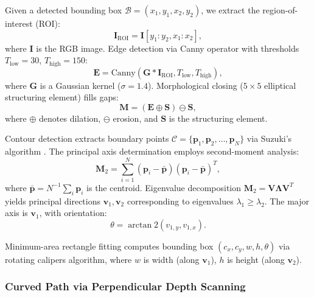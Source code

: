 \documentclass[journal]{IEEEtran}
\begin{document}
Given a detected bounding box $\mathcal{B} = (x_1, y_1, x_2, y_2)$, we extract the region-of-interest (ROI):
\begin{equation}
\mathbf{I}_{\text{ROI}} = \mathbf{I}[y_1:y_2, x_1:x_2],
\label{eq:roi_extraction}
\end{equation}
where $\mathbf{I}$ is the RGB image. Edge detection via Canny operator \cite{canny1986computational} with thresholds $T_{\text{low}} = 30$, $T_{\text{high}} = 150$:
\begin{equation}
\mathbf{E} = \text{Canny}(\mathbf{G} \ast \mathbf{I}_{\text{ROI}}, T_{\text{low}}, T_{\text{high}}),
\label{eq:canny_edge}
\end{equation}
where $\mathbf{G}$ is a Gaussian kernel ($\sigma = 1.4$). Morphological closing ($5 \times 5$ elliptical structuring element) fills gaps:
\begin{equation}
\mathbf{M} = (\mathbf{E} \oplus \mathbf{S}) \ominus \mathbf{S},
\label{eq:morphological_closing}
\end{equation}
where $\oplus$ denotes dilation, $\ominus$ erosion, and $\mathbf{S}$ is the structuring element.

Contour detection extracts boundary points $\mathcal{C} = \{\boldsymbol{p}_1, \boldsymbol{p}_2, \ldots, \boldsymbol{p}_N\}$ via Suzuki's algorithm \cite{suzuki1985topological}. The principal axis determination employs second-moment analysis:
\begin{equation}
\mathbf{M}_2 = \sum_{i=1}^{N} (\boldsymbol{p}_i - \bar{\boldsymbol{p}}) (\boldsymbol{p}_i - \bar{\boldsymbol{p}})^T,
\label{eq:second_moment}
\end{equation}
where $\bar{\boldsymbol{p}} = N^{-1} \sum_{i} \boldsymbol{p}_i$ is the centroid. Eigenvalue decomposition $\mathbf{M}_2 = \mathbf{V} \boldsymbol{\Lambda} \mathbf{V}^T$ yields principal directions $\boldsymbol{v}_1, \boldsymbol{v}_2$ corresponding to eigenvalues $\lambda_1 \geq \lambda_2$. The major axis is $\boldsymbol{v}_1$, with orientation:
\begin{equation}
\theta = \arctan2(v_{1,y}, v_{1,x}).
\label{eq:principal_angle}
\end{equation}

Minimum-area rectangle fitting \cite{freeman1975determining} computes bounding box $(c_x, c_y, w, h, \theta)$ via rotating calipers algorithm, where $w$ is width (along $\boldsymbol{v}_1$), $h$ is height (along $\boldsymbol{v}_2$).

\subsubsection{Curved Path via Perpendicular Depth Scanning}
\end{document}
